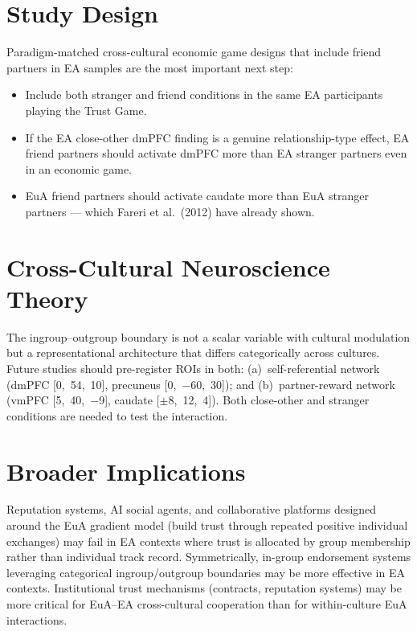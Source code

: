 \documentclass[11pt,a4paper]{report}
\begin{document}
\section*{Study Design}

Paradigm-matched cross-cultural economic game designs that include friend partners in EA
samples are the most important next step:
\begin{itemize}
  \item Include both stranger and friend conditions in the same EA participants playing the
    Trust Game.
  \item If the EA close-other dmPFC finding is a genuine relationship-type effect, EA friend
    partners should activate dmPFC more than EA stranger partners even in an economic game.
  \item EuA friend partners should activate caudate more than EuA stranger partners ---
    which Fareri et al.\ (2012) have already shown.
\end{itemize}

\section*{Cross-Cultural Neuroscience Theory}

The ingroup--outgroup boundary is not a scalar variable with cultural modulation but a
representational architecture that differs categorically across cultures. Future studies
should pre-register ROIs in both: (a)~self-referential network (dmPFC [0,~54,~10], precuneus
[0,~$-$60,~30]); and (b)~partner-reward network (vmPFC [5,~40,~$-$9], caudate
[$\pm$8,~12,~4]). Both close-other and stranger conditions are needed to test the
interaction.

\section*{Broader Implications}

Reputation systems, AI social agents, and collaborative platforms designed around the EuA
gradient model (build trust through repeated positive individual exchanges) may fail in EA
contexts where trust is allocated by group membership rather than individual track record.
Symmetrically, in-group endorsement systems leveraging categorical ingroup/outgroup boundaries
may be more effective in EA contexts. Institutional trust mechanisms (contracts, reputation
systems) may be more critical for EuA--EA cross-cultural cooperation than for within-culture
EuA interactions.
\end{document}
